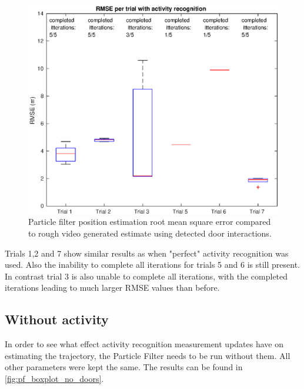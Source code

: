 \begin{figure}[H]
	\centering
	\includegraphics[width=0.7\linewidth]{images/20201118_1211_RMSE_per_trial_with_activity_recognition}
	\caption[Particle Filter position estimation performance with door interaction]{Particle filter position estimation root mean square error compared to rough video generated estimate using detected door interactions.}
	\label{fig:rmse_per_trial_with_activity_recognition}
\end{figure}

Trials 1,2 and 7 show similar results as when "perfect" activity recognition was used. Also the inability to complete all iterations for trials 5 and 6 is still present. In contrast trial 3 is also unable to complete all iterations, with the completed iterations leading to much larger RMSE values than before. 

\newpage
\subsection{Without activity}
In order to see what effect activity recognition measurement updates have on estimating the trajectory, the Particle Filter needs to be run without them. All other parameters were kept the same. The results can be found in \cref{fig:pf_boxplot_no_doors}.

